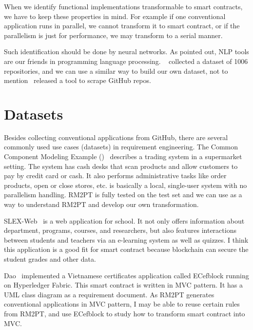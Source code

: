 When we identify functional implementations transformable to smart contracts, we have to keep these properties in mind. For example if one conventional application runs in parallel, we cannot transform it to smart contract, or if the parallelism is just for performance, we may transform to a serial manner.

Such identification should be done by neural networks. As  pointed out, NLP tools are our friends in programming language processing.
~\cite{jiang2017} collected a dataset of \num{1006} repositories,
and we can use a similar way to build our own dataset, not to mention~\cite{alexandru2017replicating} released a tool to scrape GitHub repos.




\section{Datasets}
Besides collecting conventional applications from GitHub,
there are several commonly used use cases (datasets) in requirement engineering.
The Common Component Modeling Example (\cocome)~\cite{herold2008cocome} describes a trading system in a supermarket setting.
The system has cash desks that scan products and allow customers to pay by credit card or cash. It also performs administrative tasks like order products, open or close stores, etc.
{\cocome} is basically a local, single-user system with no parallelism handling.
RM2PT is fully tested on the {\cocome} test set and we can use {\cocome} as a way to understand RM2PT and develop our own transformation.

SLEX-Web~\cite{jantan2012extension} is a web application for school. It not only offers information about department, programs, courses, and researchers, but also features interactions between students and teachers via an e-learning system as well as quizzes.
I think this application is a good fit for smart contract because blockchain can secure the student grades and other data.


Dao~\cite{dao2019challenges} implemented a Vietnamese certificates application called ECefblock running on Hyperledger Fabric. This smart contract is written in MVC pattern. It has a UML class diagram as a requirement document. As RM2PT generates conventional applications in MVC pattern, I may be able to reuse certain rules from RM2PT, and use ECefblock to study how to transform smart contract into MVC.



